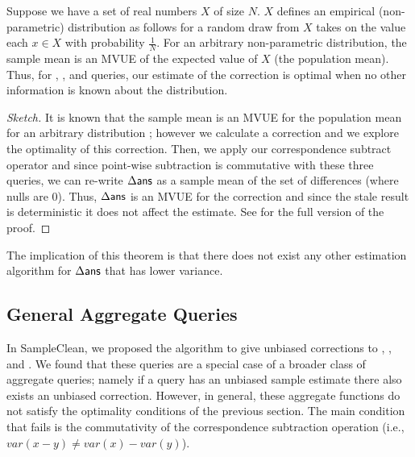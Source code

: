 \begin{theorem}
Suppose we have a set of real numbers $X$ of size $N$. 
$X$ defines an empirical (non-parametric) distribution as follows for a random draw from $X$ takes on the value each $x \in X$ with probability $\frac{1}{N}$.
For an arbitrary non-parametric distribution, the sample mean is an MVUE of the expected value of $X$ (the population mean).
Thus, for \sumfunc, \countfunc, and \avgfunc queries, our estimate of the correction is optimal when no other information is known about the distribution. 
\end{theorem}

\begin{proof}[Sketch]
It is known that the sample mean is an MVUE for the population mean for an arbitrary distribution \cite{shuster1982nonparametric}; however we calculate a correction and we explore the optimality of this correction.
Then, we apply our correspondence subtract operator and since point-wise subtraction is commutative with these three queries,
we can re-write $\Delta\textsf{ans}$ as a sample mean of the set of differences (where nulls are 0).
Thus, $\Delta\textsf{ans}$ is an MVUE for the correction and since the stale result is deterministic it does not affect the estimate.
See \cite{technicalReport} for the full version of the proof.
\end{proof}
The implication of this theorem is that there does not exist any other estimation algorithm for $\Delta\textsf{ans}$ that has lower variance.

\subsection{General Aggregate Queries}
In SampleClean, we proposed the \nsc algorithm to give unbiased corrections to \sumfunc, \countfunc, and \avgfunc.
We found that these queries are a special case of a broader class of aggregate queries; namely if a query has an unbiased sample estimate there also exists an unbiased correction.
However, in general, these aggregate functions do not satisfy the optimality conditions of the previous section.
The main condition that fails is the commutativity of the correspondence subtraction operation (i.e., $var(x-y) \ne var(x) - var(y)$).

